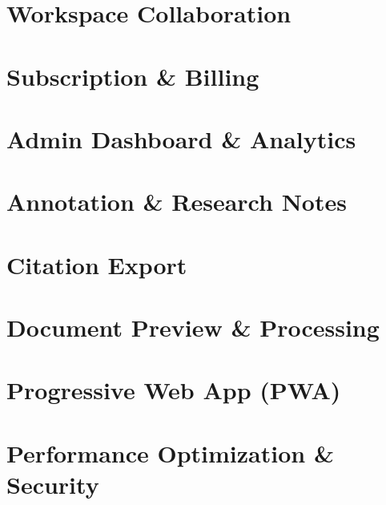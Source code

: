 
\section{Workspace Collaboration}
\label{sec:feature-workspace}


\section{Subscription \& Billing}
\label{sec:feature-billing}


\section{Admin Dashboard \& Analytics}
\label{sec:feature-admin}


\section{Annotation \& Research Notes}
\label{sec:feature-annotations}


\section{Citation Export}
\label{sec:feature-citations}


\section{Document Preview \& Processing}
\label{sec:feature-document-preview}


\section{Progressive Web App (PWA)}
\label{sec:feature-pwa}


\section{Performance Optimization \& Security}
\label{sec:feature-performance}

